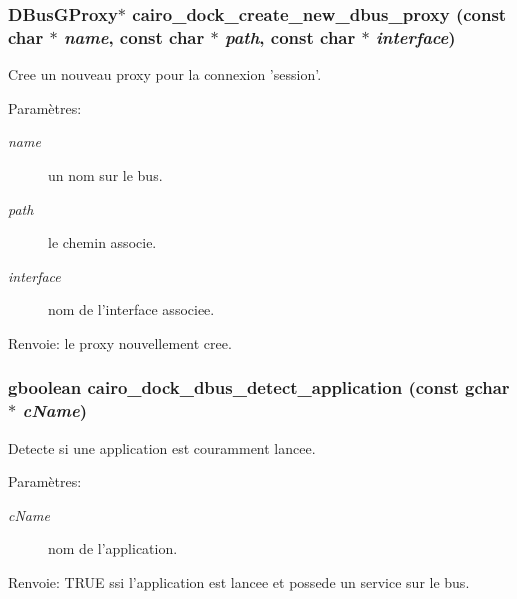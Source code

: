 \subsubsection{\setlength{\rightskip}{0pt plus 5cm}DBusGProxy$\ast$ cairo\_\-dock\_\-create\_\-new\_\-dbus\_\-proxy (const char $\ast$ {\em name}, const char $\ast$ {\em path}, const char $\ast$ {\em interface})}\label{cairo-dock-dbus_8h_1177d4b7d39129b56d5b7e1c657b1f83}


Cree un nouveau proxy pour la connexion 'session'. \begin{Desc}
\item[Paramètres:]
\begin{description}
\item[{\em name}]un nom sur le bus. \item[{\em path}]le chemin associe. \item[{\em interface}]nom de l'interface associee. \end{description}
\end{Desc}
\begin{Desc}
\item[Renvoie:]le proxy nouvellement cree. \end{Desc}
\subsubsection{\setlength{\rightskip}{0pt plus 5cm}gboolean cairo\_\-dock\_\-dbus\_\-detect\_\-application (const gchar $\ast$ {\em cName})}\label{cairo-dock-dbus_8h_afb96e15a8c3382b18c94897fda490f7}


Detecte si une application est couramment lancee. \begin{Desc}
\item[Paramètres:]
\begin{description}
\item[{\em cName}]nom de l'application. \end{description}
\end{Desc}
\begin{Desc}
\item[Renvoie:]TRUE ssi l'application est lancee et possede un service sur le bus. \end{Desc}

